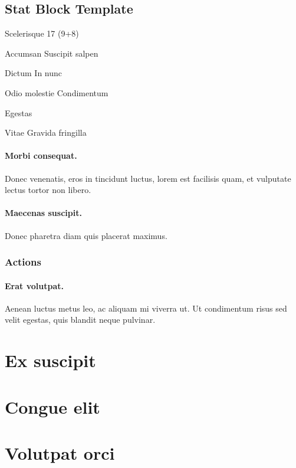 \begin{hbStatBlock}
\subsection*{Stat Block Template}
\hbSBSep
\begin{hbStatBlockDescription}
\item[Scelerisque] 17 (9+8)
\item[Accumsan] Suscipit salpen
\item[Dictum] In nunc
\end{hbStatBlockDescription}
\hbSBSep
{}
\hbSBSep
\begin{hbStatBlockDescription}
\item[Odio molestie] Condimentum
\item[Egestas] \hbNone
\item[Vitae] Gravida fringilla
\end{hbStatBlockDescription}
\hbSBSep

\paragraph*{Morbi consequat.} Donec venenatis, eros in tincidunt luctus, lorem est facilisis quam, et vulputate lectus tortor non libero.

\paragraph*{Maecenas suscipit.} Donec pharetra diam quis placerat maximus.

\subsubsection*{Actions}

\paragraph*{Erat volutpat.} Aenean luctus metus leo, ac aliquam mi viverra ut. Ut condimentum risus sed velit egestas, quis blandit neque pulvinar.

\end{hbStatBlock}




\hbAppendix



\section{Ex suscipit} \lipsum[126]
\section{Congue elit} \lipsum[128-129]
\section{Volutpat orci} \lipsum[130-131]

\backmatter

 \lipsum[127]


